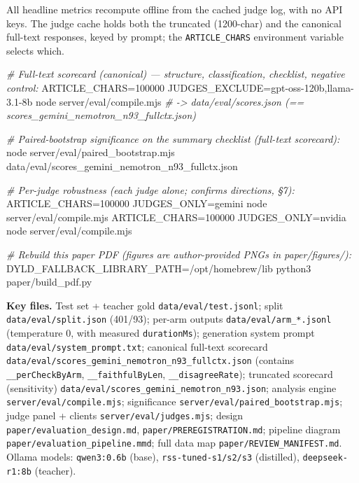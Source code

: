 \documentclass[11pt]{article}
\newenvironment{Shaded}{}{}
\newcommand{\CommentTok}[1]{\textcolor[rgb]{0.38,0.63,0.69}{\textit{#1}}}
\newcommand{\ExtensionTok}[1]{#1}
\newcommand{\NormalTok}[1]{#1}
\newcommand{\OperatorTok}[1]{\textcolor[rgb]{0.40,0.40,0.40}{#1}}
\newcommand{\VariableTok}[1]{\textcolor[rgb]{0.10,0.09,0.49}{#1}}
\begin{document}
All headline metrics recompute offline from the cached judge log, with
no API keys. The judge cache holds both the truncated (1200-char) and
the canonical full-text responses, keyed by prompt; the
\texttt{ARTICLE\_CHARS} environment variable selects which.

\begin{Shaded}
\begin{Highlighting}[]
\CommentTok{\# Full{-}text scorecard (canonical) — structure, classification, checklist, negative control:}
\VariableTok{ARTICLE\_CHARS}\OperatorTok{=}\NormalTok{100000 }\VariableTok{JUDGES\_EXCLUDE}\OperatorTok{=}\NormalTok{gpt{-}oss{-}120b,llama{-}3.1{-}8b }\ExtensionTok{node}\NormalTok{ server/eval/compile.mjs}
\CommentTok{\# {-}\textgreater{} data/eval/scores.json (== scores\_gemini\_nemotron\_n93\_fullctx.json)}

\CommentTok{\# Paired{-}bootstrap significance on the summary checklist (full{-}text scorecard):}
\ExtensionTok{node}\NormalTok{ server/eval/paired\_bootstrap.mjs data/eval/scores\_gemini\_nemotron\_n93\_fullctx.json}

\CommentTok{\# Per{-}judge robustness (each judge alone; confirms directions, §7):}
\VariableTok{ARTICLE\_CHARS}\OperatorTok{=}\NormalTok{100000 }\VariableTok{JUDGES\_ONLY}\OperatorTok{=}\NormalTok{gemini }\ExtensionTok{node}\NormalTok{ server/eval/compile.mjs}
\VariableTok{ARTICLE\_CHARS}\OperatorTok{=}\NormalTok{100000 }\VariableTok{JUDGES\_ONLY}\OperatorTok{=}\NormalTok{nvidia }\ExtensionTok{node}\NormalTok{ server/eval/compile.mjs}

\CommentTok{\# Rebuild this paper PDF (figures are author{-}provided PNGs in paper/figures/):}
\VariableTok{DYLD\_FALLBACK\_LIBRARY\_PATH}\OperatorTok{=}\NormalTok{/opt/homebrew/lib }\ExtensionTok{python3}\NormalTok{ paper/build\_pdf.py}
\end{Highlighting}
\end{Shaded}

\textbf{Key files.} Test set + teacher gold
\texttt{data/eval/test.jsonl}; split \texttt{data/eval/split.json}
(401/93); per-arm outputs \texttt{data/eval/arm\_*.jsonl} (temperature
0, with measured \texttt{durationMs}); generation system prompt
\texttt{data/eval/system\_prompt.txt}; canonical full-text scorecard
\texttt{data/eval/scores\_gemini\_nemotron\_n93\_fullctx.json} (contains
\texttt{\_\_perCheckByArm}, \texttt{\_\_faithfulByLen},
\texttt{\_\_disagreeRate}); truncated scorecard (sensitivity)
\texttt{data/eval/scores\_gemini\_nemotron\_n93.json}; analysis engine
\texttt{server/eval/compile.mjs}; significance
\texttt{server/eval/paired\_bootstrap.mjs}; judge panel + clients
\texttt{server/eval/judges.mjs}; design
\texttt{paper/evaluation\_design.md}, \texttt{paper/PREREGISTRATION.md};
pipeline diagram \texttt{paper/evaluation\_pipeline.mmd}; full data map
\texttt{paper/REVIEW\_MANIFEST.md}. Ollama models: \texttt{qwen3:0.6b}
(base), \texttt{rss-tuned-s1/s2/s3} (distilled), \texttt{deepseek-r1:8b}
(teacher).
\end{document}
